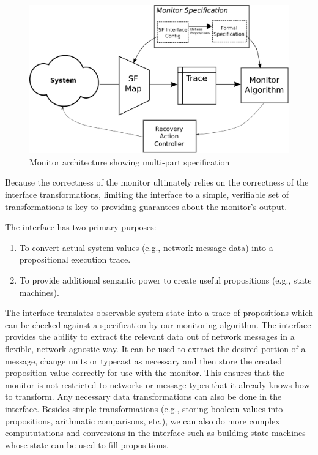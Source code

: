 \begin{figure}
\includegraphics[width=4.5in]{img/arch_config}
\caption{Monitor architecture showing multi-part specification \label{fig:arch:arch_config}}
\end{figure}
Because the correctness of the monitor ultimately relies on the correctness of the interface transformations, limiting the interface to a simple, verifiable set of transformations is key to providing guarantees about the monitor's output.

The interface has two primary purposes: 

\begin{enumerate}
	\item To convert actual system values (e.g., network message data) into a propositional execution trace. 
	\item To provide additional semantic power to create useful propositions (e.g., state machines).
\end{enumerate}

The interface translates observable system state into a trace of propositions which can be checked against a specification by our monitoring algorithm. 
%
The interface provides the ability to extract the relevant data out of network messages in a flexible, network agnostic way. It can be used to extract the desired portion of a message, change units or typecast as necessary and then store the created proposition value correctly for use with the monitor. This ensures that the monitor is not restricted to networks or message types that it already knows how to transform. Any necessary data transformations can also be done in the interface.
%
Besides simple transformations (e.g., storing boolean values into propositions, arithmatic comparisons, etc.), we can also do more complex compututations and conversions in the interface such as building state machines whose state can be used to fill propositions.

